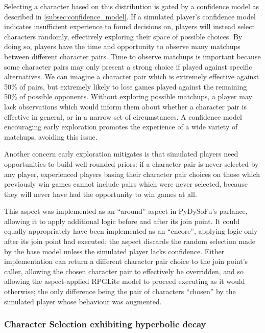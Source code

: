 Selecting a character based on this distribution is gated by a confidence model
as described in \cref{subsec:confidence_model}. If a simulated player's
confidence model indicates insufficient experience to found decisions on,
players will instead select characters randomly, effectively exploring their
space of possible choices. By doing so, players have the time and opportunity to
observe many matchups between different character pairs. Time to observe
matchups is important because some character pairs may only present a strong
choice if played against specific alternatives. We can imagine a character pair
which is extremely effective against 50\% of pairs, but extremely likely to lose
games played against the remaining 50\% of possible opponents. Without exploring
possible matchups, a player may lack observations which would inform them about
whether a character pair is effective in general, or in a narrow set of
circumstances. A confidence model encouraging early exploration promotes the
experience of a wide variety of matchups, avoiding this issue.

Another concern early exploration mitigates is that simulated players need
opportunities to build well-rounded priors: if a character pair is never
selected by any player, experienced players basing their character pair choices
on those which previously win games cannot include pairs which were never
selected, because they will never have had the opportunity to win games at all.

This aspect was implemented as an ``around'' aspect in PyDySoFu's parlance,
allowing it to apply additional logic before and after its join point. It could
equally appropriately have been implemented as an ``encore'', applying logic
only after its join point had executed; the aspect discards the random selection
made by the base model unless the simulated player lacks confidence. Either
implementation can return a different character pair choice to the join point's
caller, allowing the chosen character pair to effectively be overridden, and so
allowing the aspect-applied RPGLite model to proceed executing as it would
otherwise; the only difference being the pair of characters ``chosen'' by the
simulated player whose behaviour was augmented.


\subsubsection{Character Selection exhibiting hyperbolic decay}\label{subsubsec:learning_with_hyperbolic_decay}

